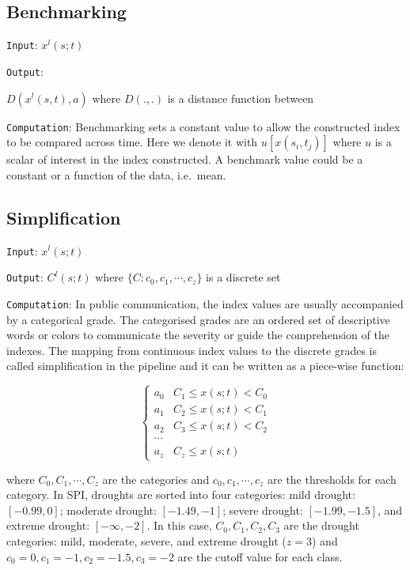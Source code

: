 \documentclass[
]{interact}
\begin{document}
\hypertarget{benchmarking}{%
\subsection{Benchmarking}\label{benchmarking}}

\texttt{Input}: \(x^l(s; t)\)

\texttt{Output}:

\(D(x^l(s,t), a)\) where \(D(., .)\) is a distance function between

\texttt{Computation}: Benchmarking sets a constant value to allow the
constructed index to be compared across time. Here we denote it with
\(u[x(s_i, t_j)]\) where \(u\) is a scalar of interest in the index
constructed. A benchmark value could be a constant or a function of the
data, i.e.~mean.

\hypertarget{simplification}{%
\subsection{Simplification}\label{simplification}}

\texttt{Input}: \(x^l(s; t)\)

\texttt{Output}: \(C^l(s;t)\) where \(\{C: c_0, c_1, \cdots, c_z\}\) is
a discrete set

\texttt{Computation}: In public communication, the index values are
usually accompanied by a categorical grade. The categorised grades are
an ordered set of descriptive words or colors to communicate the
severity or guide the comprehension of the indexes. The mapping from
continuous index values to the discrete grades is called simplification
in the pipeline and it can be written as a piece-wise function:

\begin{equation}
\begin{cases}
a_0 & C_1 \leq x(s; t) < C_0 \\
a_1 & C_2 \leq x(s; t) < C_1 \\
a_2 & C_3 \leq x(s; t) < C_2 \\
\cdots \\
a_z & C_z \leq x(s; t)
\end{cases}
\end{equation}

where \(C_0, C_1,\cdots ,C_z\) are the categories and
\(c_0, c_1, \cdots, c_z\) are the thresholds for each category. In SPI,
droughts are sorted into four categories: mild drought: \([-0.99, 0]\);
moderate drought: \([-1.49, -1]\); severe drought: \([-1.99, -1.5]\),
and extreme drought: \([-\infty, -2]\). In this case,
\(C_0, C_1, C_2, C_3\) are the drought categories: mild, moderate,
severe, and extreme drought (\(z = 3\)) and
\(c_0 =0, c_1 = -1, c_2 = -1.5, c_3 = -2\) are the cutoff value for each
class.
\end{document}
